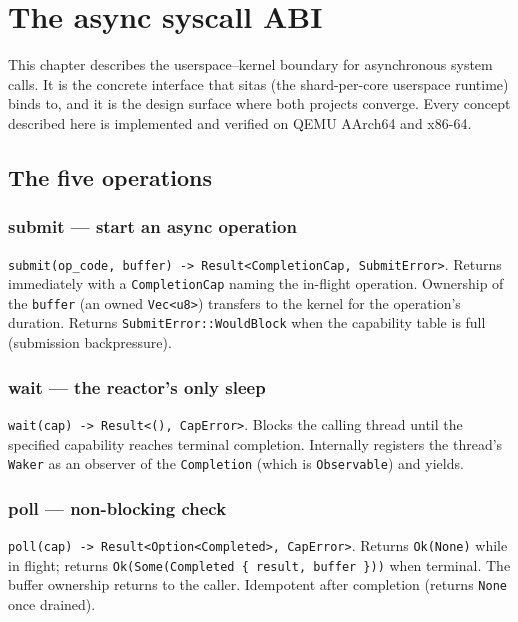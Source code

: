 \chapter{The async syscall ABI}

This chapter describes the userspace--kernel boundary for asynchronous system
calls. It is the concrete interface that sitas (the shard-per-core userspace
runtime) binds to, and it is the design surface where both projects converge.
Every concept described here is implemented and verified on QEMU AArch64 and
x86-64.

\section{The five operations}

\subsection{submit --- start an async operation}

\texttt{submit(op\_code, buffer) -> Result<CompletionCap, SubmitError>}.
Returns immediately with a \texttt{CompletionCap} naming the in-flight
operation. Ownership of the \texttt{buffer} (an owned \texttt{Vec<u8>})
transfers to the kernel for the operation's duration. Returns
\texttt{SubmitError::WouldBlock} when the capability table is full
(submission backpressure).

\subsection{wait --- the reactor's only sleep}

\texttt{wait(cap) -> Result<(), CapError>}. Blocks the calling thread
until the specified capability reaches terminal completion. Internally
registers the thread's \texttt{Waker} as an observer of the
\texttt{Completion} (which is \texttt{Observable}) and yields.

\subsection{poll --- non-blocking check}

\texttt{poll(cap) -> Result<Option<Completed>, CapError>}. Returns
\texttt{Ok(None)} while in flight; returns \texttt{Ok(Some(Completed \{ 
result, buffer \}))} when terminal. The buffer ownership returns to the
caller. Idempotent after completion (returns \texttt{None} once drained).

